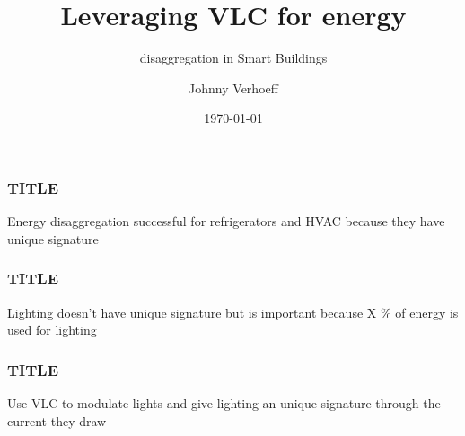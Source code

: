 \documentclass{beamer}
\title[Mid-term Presentation]{Leveraging VLC for energy }
\subtitle{disaggregation in Smart Buildings}
\institute[TU Delft]{Delft University of Technology}
\author{Johnny Verhoeff}
\date{\today}
\newcommand*\titleTOC{Outline}
\begin{document}
 {
	\frame{\titlepage}
}

\beamertemplatenavigationsymbolsempty




	\begin{frame}\frametitle{TITLE}
		Energy disaggregation successful for refrigerators and HVAC because they have  unique signature
	\end{frame}

	\begin{frame}\frametitle{TITLE}
		Lighting doesn't have unique signature but is important because X \% of energy is used for lighting
	\end{frame}

	\begin{frame}\frametitle{TITLE}
		Use VLC to modulate lights and give lighting an unique signature through the current they draw
	\end{frame}
\end{document}
